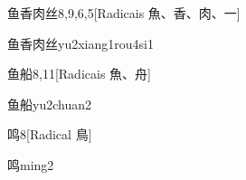 \begin{entry}{鱼香肉丝}{8,9,6,5}[Radicais ⿂、⾹、⾁、⼀]
  \begin{phonetics}{鱼香肉丝}{yu2xiang1rou4si1}
  \end{phonetics}
\end{entry}

\begin{entry}{鱼船}{8,11}[Radicais ⿂、⾈]
  \begin{phonetics}{鱼船}{yu2chuan2}
  \end{phonetics}
\end{entry}

\begin{entry}{鸣}{8}[Radical ⿃]
  \begin{phonetics}{鸣}{ming2}
  \end{phonetics}
\end{entry}


